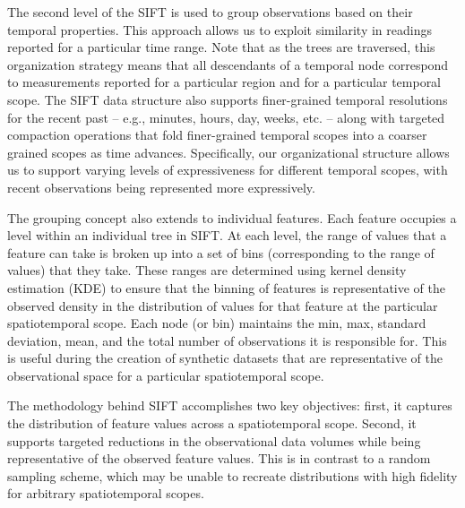 \documentclass[9pt,journal,compsoc]{IEEEtran}
\begin{document}
The second level of the SIFT is used to group observations based on their temporal properties. This approach allows us to exploit similarity in readings reported for a particular time range. Note that as the trees are traversed, this organization strategy means that all descendants of a temporal node correspond to measurements reported for a particular region and for a particular temporal scope. The SIFT data structure also supports finer-grained temporal resolutions for the recent past -- e.g., minutes, hours, day, weeks, etc. -- along with targeted compaction operations that fold finer-grained temporal scopes into a coarser grained scopes as time advances. Specifically, our organizational structure allows us to support varying levels of expressiveness for different temporal scopes, with recent observations being represented more expressively.

The grouping concept also extends to individual features. Each feature occupies a level within an individual tree in SIFT. At each level, the range of values that a feature can take is broken up into a set of bins (corresponding to the range of values) that they take. These ranges are determined using kernel density estimation (KDE) to ensure that the binning of features is representative of the observed density in the distribution of values for that feature at the particular spatiotemporal scope. Each node (or bin) maintains the min, max, standard deviation, mean, and the total number of observations it is responsible for.  This is useful during the creation of synthetic datasets that are representative of the observational space for a particular spatiotemporal scope.

The methodology behind SIFT accomplishes two key objectives: first, it captures the distribution of feature values across a spatiotemporal scope. Second, it supports targeted reductions in the observational data volumes while being representative of the observed feature values. This is in contrast to a random sampling scheme, which may be unable to recreate distributions with high fidelity for arbitrary spatiotemporal scopes.
\end{document}
